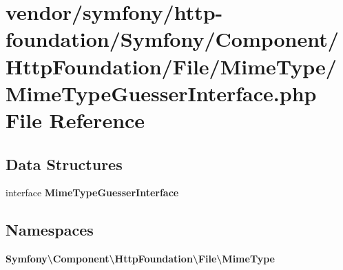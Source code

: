 \section{vendor/symfony/http-\/foundation/\+Symfony/\+Component/\+Http\+Foundation/\+File/\+Mime\+Type/\+Mime\+Type\+Guesser\+Interface.php File Reference}
\label{_mime_type_guesser_interface_8php}
\subsection*{Data Structures}
\begin{DoxyCompactItemize}
\item 
interface {\bf Mime\+Type\+Guesser\+Interface}
\end{DoxyCompactItemize}
\subsection*{Namespaces}
\begin{DoxyCompactItemize}
\item 
 {\bf Symfony\textbackslash{}\+Component\textbackslash{}\+Http\+Foundation\textbackslash{}\+File\textbackslash{}\+Mime\+Type}
\end{DoxyCompactItemize}
